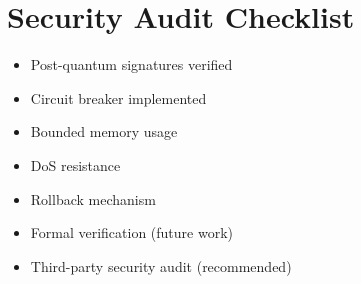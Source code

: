 \documentclass[11pt,a4paper]{article}
\begin{document}
\section{Security Audit Checklist}

\begin{itemize}
    \item[$\boxtimes$] Post-quantum signatures verified
    \item[$\boxtimes$] Circuit breaker implemented
    \item[$\boxtimes$] Bounded memory usage
    \item[$\boxtimes$] DoS resistance
    \item[$\boxtimes$] Rollback mechanism
    \item[$\Box$] Formal verification (future work)
    \item[$\Box$] Third-party security audit (recommended)
\end{itemize}
\end{document}
